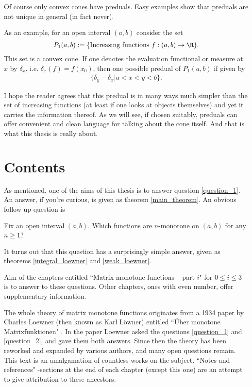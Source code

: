 Of course only convex cones have preduals. Easy examples show that preduals are not unique in general (in fact never).

As an example, for an open interval $(a, b)$ consider the set
\begin{align*}
	P_{1}(a, b) := \{\text{Increasing functions $f : (a, b) \to \R$}\}.
\end{align*}
This set is a convex cone. If one denotes the evaluation functional or measure at $x$ by $\delta_{x}$, i.e. $\delta_{x}(f) = f(x_{0})$, then one possible predual of $P_{1}(a, b)$ if given by
\begin{align*}
	\{\delta_{y} - \delta_{x} | a < x < y < b \}.
\end{align*}

I hope the reader agrees that this predual is in many ways much simpler than the set of increasing functions (at least if one looks at objects themselves) and yet it carries the information thereof. As we will see, if chosen suitably, preduals can offer convenient and clean language for talking about the cone itself. And that is what this thesis is really about.

\section{Contents}

As mentioned, one of the aims of this thesis is to answer question \ref{question_1}. An answer, if you're curious, is given as theorem \ref{main_theorem}. An obvious follow up question is

\begin{quest}\label{question_2}
	Fix an open interval $(a, b)$. Which functions are $n$-monotone on $(a, b)$ for any $n \geq 1$?
\end{quest}

It turns out that this question has a surprisingly simple answer, given as theorems \ref{integral_loewner} and \ref{weak_loewner}.

Aim of the chapters entitled ``Matrix monotone functions -- part $i$" for $0 \leq i \leq 3$ is to answer to these questions. Other chapters, ones with even number, offer supplementary information.

The whole theory of matrix monotone functions originates from a 1934 paper by Charles Loewner (then known as Karl Löwner) entitled ``Über monotone Matrixfunktionen" \cite{Low}. In the paper Loewner asked the questions \ref{question_1} and \ref{question_2}, and gave them both answers. Since then the theory has been reworked and expanded by various authors, and many open questions remain. This text is an amalgamation of countless works on the subject. ``Notes and references" -sections at the end of each chapter (except this one) are an attempt to give attribution to these ancestors.

